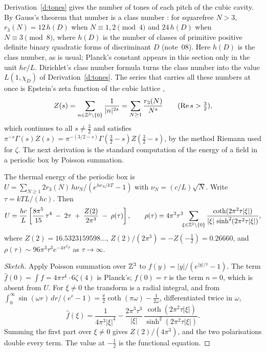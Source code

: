 \documentclass[11pt]{article}
\begin{document}
Derivation~\ref{d:tones} gives the number of tones of each pitch of the cubic cavity.
By Gauss's theorem that number is a class number \cite{Gauss}: for squarefree $N>3$, $r_3(N) = 12\,h(D)$ when $N\equiv1,2\pmod 4$ and $24\,h(D)$ when $N\equiv3\pmod 8$, where $h(D)$ is the number of classes of primitive positive definite binary quadratic forms of discriminant $D$ (note~08).
Here $h(D)$ is the class number, as is usual; Planck's constant appears in this section only in the unit $hc/L$.
Dirichlet's class number formula \cite{Dirichlet} turns the class number into the value $L(1,\chi_D)$ of Derivation~\ref{d:tones}.
The series that carries all these numbers at once is Epstein's zeta function of the cubic lattice \cite{Epstein},
\[
  Z(s) = \sum_{n\in\mathbb{Z}^3\setminus\{0\}}\frac{1}{|n|^{2s}} = \sum_{N\ge1}\frac{r_3(N)}{N^s}\qquad(\operatorname{Re}s>\tfrac32),
\]
which continues to all $s\ne\tfrac32$ and satisfies $\pi^{-s}\Gamma(s)Z(s) = \pi^{-(3/2-s)}\Gamma(\tfrac32-s)Z(\tfrac32-s)$, by the method Riemann used for $\zeta$.
The next derivation is the standard computation of the energy of a field in a periodic box by Poisson summation.

\begin{derivation}\label{d:exact}
The thermal energy of the periodic box is $U = \sum_{N\ge1}2r_3(N)\,h\nu_N/(e^{h\nu_N/kT}-1)$ with $\nu_N = (c/L)\sqrt N$.
Write $\tau = kTL/(hc)$. Then
\[
  U = \frac{hc}{L}\left[\frac{8\pi^5}{15}\,\tau^4 \;-\; 2\tau \;+\; \frac{Z(2)}{2\pi^3}\;-\;\rho(\tau)\right],
  \qquad
  \rho(\tau) = 4\pi^3\tau^3\!\!\sum_{\xi\in\mathbb{Z}^3\setminus\{0\}}\frac{\coth(2\pi^2\tau|\xi|)}{|\xi|\,\sinh^2(2\pi^2\tau|\xi|)} ,
\]
where $Z(2) = 16.5323159598\ldots$, $Z(2)/(2\pi^3) = -Z(-\tfrac12) = 0.26660$, and $\rho(\tau)\sim96\pi^3\tau^3e^{-4\pi^2\tau}$ as $\tau\to\infty$.
\end{derivation}

\begin{proof}[Sketch]
Apply Poisson summation over $\mathbb{Z}^3$ to $f(y) = |y|/(e^{|y|/\tau}-1)$.
The term $\hat f(0) = \int f = 4\pi\tau^4\cdot6\zeta(4)$ is Planck's; $f(0) = \tau$ is the term $n=0$, which is absent from $U$.
For $\xi\ne0$ the transform is a radial integral, and from $\int_0^\infty\sin(\omega r)\,dr/(e^r-1) = \tfrac\pi2\coth(\pi\omega)-\tfrac1{2\omega}$, differentiated twice in $\omega$,
\[
  \hat f(\xi) = \frac{1}{4\pi^3|\xi|^4} - \frac{2\pi^3\tau^3}{|\xi|}\,\frac{\coth(2\pi^2\tau|\xi|)}{\sinh^2(2\pi^2\tau|\xi|)} .
\]
Summing the first part over $\xi\ne0$ gives $Z(2)/(4\pi^3)$, and the two polarisations double every term.
The value at $-\tfrac12$ is the functional equation.
\end{proof}
\end{document}
